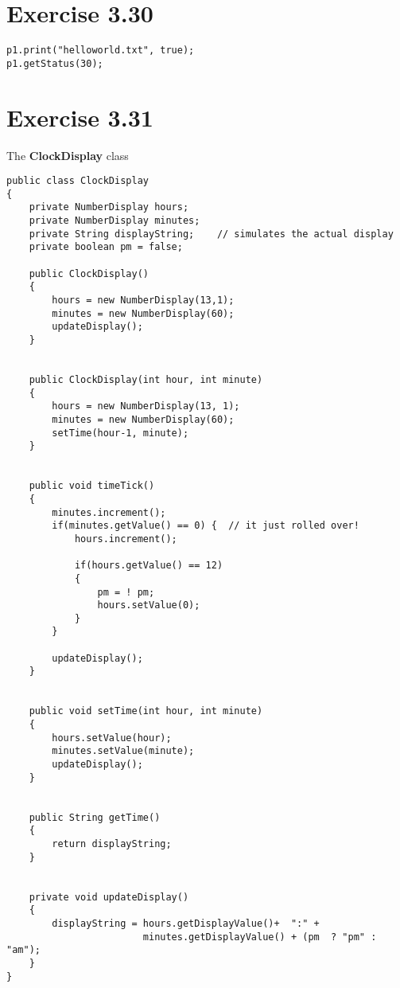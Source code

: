 \documentclass[10pt,a4paper]{article}
\begin{document}
\section*{Exercise 3.30}
\begin{lstlisting}
p1.print("helloworld.txt", true);
p1.getStatus(30);
\end{lstlisting}

\section*{Exercise 3.31}
The \textbf{ClockDisplay} class
\begin{lstlisting}
public class ClockDisplay
{
    private NumberDisplay hours;
    private NumberDisplay minutes;
    private String displayString;    // simulates the actual display
    private boolean pm = false;
    
    public ClockDisplay()
    {
        hours = new NumberDisplay(13,1);
        minutes = new NumberDisplay(60);
        updateDisplay();
    }


    public ClockDisplay(int hour, int minute)
    {
        hours = new NumberDisplay(13, 1);
        minutes = new NumberDisplay(60);
        setTime(hour-1, minute);
    }


    public void timeTick()
    {
        minutes.increment();
        if(minutes.getValue() == 0) {  // it just rolled over!
            hours.increment();
            
            if(hours.getValue() == 12)
            {
                pm = ! pm;
                hours.setValue(0);
            }
        }
        
        updateDisplay();
    }


    public void setTime(int hour, int minute)
    {
        hours.setValue(hour);
        minutes.setValue(minute);
        updateDisplay();
    }


    public String getTime()
    {
        return displayString;
    }
    

    private void updateDisplay()
    {
        displayString = hours.getDisplayValue()+  ":" + 
                        minutes.getDisplayValue() + (pm  ? "pm" : "am");
    }
}

\end{lstlisting}
\end{document}
